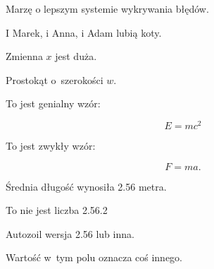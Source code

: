 \documentclass{article}
\begin{document}
Marzę o lepszym systemie wykrywania błędów.

I Marek, i  Anna, i
Adam lubią koty.

Zmienna $x$ jest duża. %

Prostokąt o~szerokości $w$.

To jest genialny wzór:

\[ E = mc^2 \]

To jest zwykły wzór:

\[ F = ma. \]

Średnia długość wynosiła 2.56 metra.

To nie jest liczba 2.56.2

Autozoil wersja 2.56 lub inna.

Wartość  w~tym polu oznacza coś innego.
\end{document}
